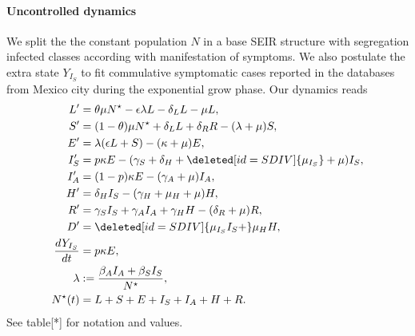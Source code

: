 \paragraph{Uncontrolled dynamics}
	We split the the constant population $N$ in a base SEIR
structure with segregation infected classes according with
manifestation  of symptoms. We also postulate the extra state $Y_{I_S}$ to fit commulative symptomatic cases reported in the databases from Mexico city
during the exponential grow phase. Our dynamics reads
\begin{equation}
	\label{eqn:base_dynamics}
    \begin{aligned}
    	L' & = \theta \mu N^{\star}
        	-\epsilon \lambda L - \delta_L L - \mu L,
    	\\
    	S' & =
        	(1 - \theta)\mu N^\star + \delta_L  L + \delta_R R
        	- (\lambda + \mu) S,
    	\\
    	E' & =
        	\lambda (\epsilon L + S) - (\kappa + \mu) E,
    	\\
    	I_S' & =
        	p \kappa E -
        	(\gamma_S +
        	    \delta_H +
        	    \deleted[id=SDIV]{\mu_{I_S}} +
        	    \mu) I_S,
    	\\
    	I_A' &=
        	(1 - p) \kappa E - (\gamma_A + \mu) I_A,
    	\\
    	H' &=
        	\delta_H I_S - (\gamma_H + \mu_H + \mu) H,
    	\\
    	R' & =
        	\gamma_S I_S + \gamma_A I_A + \gamma_H H - (\delta_R + \mu) R,
    	\\
    	D' &=
        	\deleted[id=SDIV]{\mu_{I_S} I_S +} \mu_H H,
    	\\
    	\frac{dY_{I_S}}{dt} &  = p \kappa E,
    	\\
    	\lambda &:=
        	\frac{\beta_A I_A + \beta_S I_S}{N^{\star}},
    	\\
    	N^{\star}(t) &=
        	L + S + E +
       	 	I_S + I_A +
        	H + R .
    \end{aligned}
\end{equation}
%
     See table[*] for notation and values.
